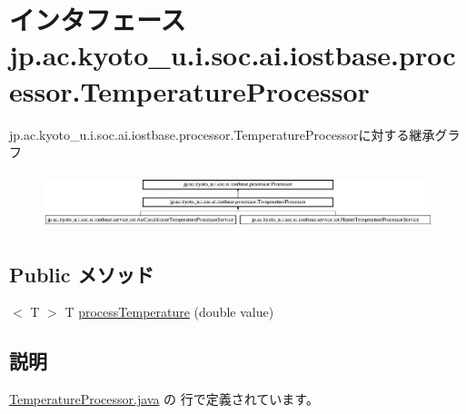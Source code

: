 \hypertarget{interfacejp_1_1ac_1_1kyoto__u_1_1i_1_1soc_1_1ai_1_1iostbase_1_1processor_1_1_temperature_processor}{\section{インタフェース jp.\-ac.\-kyoto\-\_\-u.\-i.\-soc.\-ai.\-iostbase.\-processor.\-Temperature\-Processor}
\label{interfacejp_1_1ac_1_1kyoto__u_1_1i_1_1soc_1_1ai_1_1iostbase_1_1processor_1_1_temperature_processor}
}
jp.\-ac.\-kyoto\-\_\-u.\-i.\-soc.\-ai.\-iostbase.\-processor.\-Temperature\-Processorに対する継承グラフ\begin{figure}[H]
\begin{center}
\leavevmode
\includegraphics[height=1.637427cm]{interfacejp_1_1ac_1_1kyoto__u_1_1i_1_1soc_1_1ai_1_1iostbase_1_1processor_1_1_temperature_processor}
\end{center}
\end{figure}
\subsection*{Public メソッド}
\begin{DoxyCompactItemize}
\item 
$<$ T $>$ T \hyperlink{interfacejp_1_1ac_1_1kyoto__u_1_1i_1_1soc_1_1ai_1_1iostbase_1_1processor_1_1_temperature_processor_a88283e3c8523b362fbedf38192ca8186}{process\-Temperature} (double value)
\end{DoxyCompactItemize}


\subsection{説明}


 \hyperlink{_temperature_processor_8java_source}{Temperature\-Processor.\-java} の  行で定義されています。



